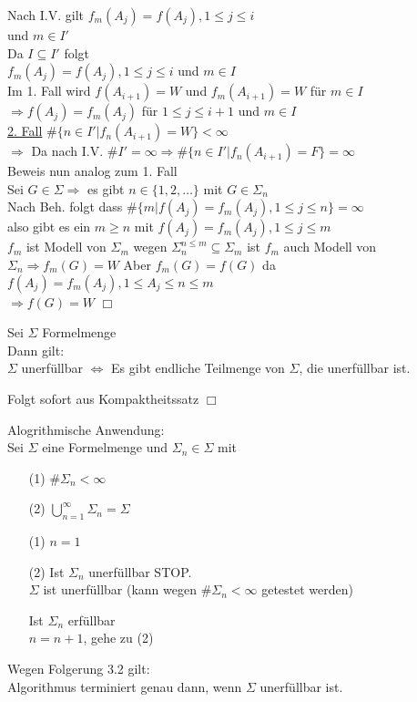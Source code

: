 Nach I.V. gilt $f_m(A_j) = f(A_j), 1 \leq j \leq i$\\
und $m \in I'$\\
Da $I \subseteq I'$ folgt\\
$f_m(A_j) = f(A_j), 1 \leq j \leq i$ und $m \in I$\\
Im 1. Fall wird $f(A_{i+1})=W$ und $f_m(A_{i+1})=W$ für $m \in I$\\
$\Rightarrow f(A_j) = f_m(A_j)$ für $1 \leq j \leq i+1$ und $m \in I$\\
\underline{2. Fall} $\# \{ n \in I' | f_n(A_{i+1})=W \} < \infty$\\
$\Rightarrow$ Da nach I.V. $\# I' = \infty \Rightarrow \# \{n \in I' | f_n(A_{i+1}) = F \} = \infty$\\

Beweis nun analog zum 1. Fall\\
Sei $G \in \Sigma \Rightarrow$ es gibt $n \in \{1, 2, …\}$ mit $G \in \Sigma_n$\\
Nach Beh. folgt dass $\# \{ m | f(A_j) = f_m(A_j), 1 \leq j \leq n \} = \infty$\\
also gibt es ein $m \geq n$ mit $f(A_j) = f_m(A_j), 1 \leq j \leq m$\\
$f_m$ ist Modell von $\Sigma_m$ wegen $\Sigma_n^{n \leq m} \subseteq \Sigma_m$ ist $f_m$ auch Modell von $\Sigma_n \Rightarrow f_m(G) = W$
Aber $f_m(G) = f(G) $ da $f(A_j) = f_m(A_j), 1 \leq A_j \leq n \leq m$\\
$\Rightarrow f(G) = W$ $\Box$

Sei $\Sigma$ Formelmenge\\
Dann gilt:\\
$\Sigma$ unerfüllbar $\Leftrightarrow$ Es gibt endliche Teilmenge von $\Sigma$, die unerfüllbar ist.

\beweis{} Folgt sofort aus Kompaktheitssatz $\Box$

Alogrithmische Anwendung:\\
Sei $\Sigma$ eine Formelmenge und $\Sigma_n \in \Sigma$ mit
\begin{enumerate}
\item[(1)] $\# \Sigma_n < \infty$

\item[(2)] $\bigcup_{n=1}^{\infty} \Sigma_n = \Sigma$
\end{enumerate}

\begin{enumerate}
\item[(1)] $n=1$

\item[(2)] Ist $\Sigma_n$ unerfüllbar STOP.\\
$\Sigma$ ist unerfüllbar \hspace{1cm} (kann wegen $\# \Sigma_n < \infty$ getestet werden)

Ist $\Sigma_n$ erfüllbar\\
$n=n+1$, gehe zu (2)
\end{enumerate}

Wegen Folgerung 3.2 gilt:\\
Algorithmus terminiert genau dann, wenn $\Sigma$ unerfüllbar ist.